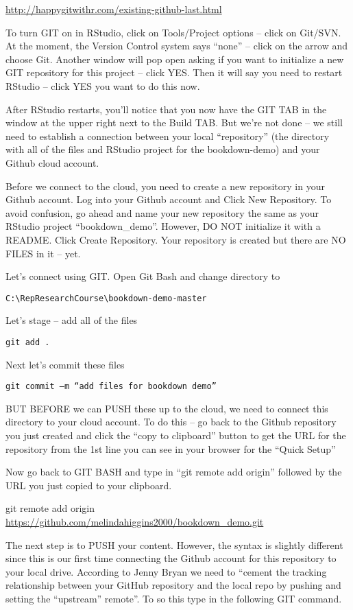 \documentclass[
]{book}
\begin{document}
\url{http://happygitwithr.com/existing-github-last.html}

To turn GIT on in RStudio, click on Tools/Project options -- click on Git/SVN. At the moment, the Version Control system says ``none'' -- click on the arrow and choose Git. Another window will pop open asking if you want to initialize a new GIT repository for this project -- click YES. Then it will say you need to restart RStudio -- click YES you want to do this now.

After RStudio restarts, you'll notice that you now have the GIT TAB in the window at the upper right next to the Build TAB. But we're not done -- we still need to establish a connection between your local ``repository'' (the directory with all of the files and RStudio project for the bookdown-demo) and your Github cloud account.

Before we connect to the cloud, you need to create a new repository in your Github account. Log into your Github account and Click New Repository. To avoid confusion, go ahead and name your new repository the same as your RStudio project ``bookdown\_demo''. However, DO NOT initialize it with a README. Click Create Repository. Your repository is created but there are NO FILES in it -- yet.

Let's connect using GIT. Open Git Bash and change directory to

\texttt{C:\textbackslash{}RepResearchCourse\textbackslash{}bookdown-demo-master}

Let's stage -- add all of the files

\texttt{git\ add\ .}

Next let's commit these files

\texttt{git\ commit\ –m\ “add\ files\ for\ bookdown\ demo”}

BUT BEFORE we can PUSH these up to the cloud, we need to connect this directory to your cloud account. To do this -- go back to the Github repository you just created and click the ``copy to clipboard'' button to get the URL for the repository from the 1st line you can see in your browser for the ``Quick Setup''

Now go back to GIT BASH and type in ``git remote add origin'' followed by the URL you just copied to your clipboard.

git remote add origin \url{https://github.com/melindahiggins2000/bookdown_demo.git}

The next step is to PUSH your content. However, the syntax is slightly different since this is our first time connecting the Github account for this repository to your local drive. According to Jenny Bryan we need to ``cement the tracking relationship between your GitHub repository and the local repo by pushing and setting the ``upstream'' remote''. To so this type in the following GIT command.
\end{document}
